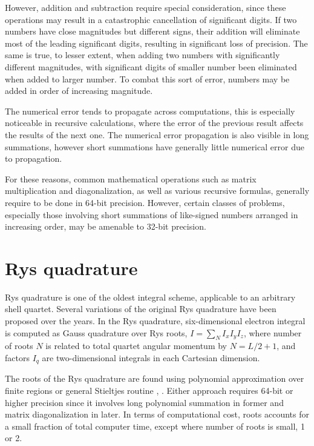 \documentclass[12pt]{article}
\begin{document}
However, addition and subtraction require special consideration, since these operations may result in a catastrophic cancellation of significant digits.
If two numbers have close magnitudes but different signs, their addition will eliminate most of the leading significant digits, resulting in significant loss of precision.
The same is true, to lesser extent, when adding two numbers with significantly different magnitudes, with significant digits of smaller number been eliminated when added
to larger number.  To combat this sort of error, numbers may be added in order of increasing magnitude.

The numerical error tends to propagate across computations, this is especially noticeable in recursive calculations, where the error of the previous result
 affects the results of the next one.  The numerical error propagation is also visible in long summations, however short summations have generally little
numerical error due to propagation.

 For these reasons, common mathematical operations such as matrix multiplication  and diagonalization, as well as various recursive formulas, generally require
to be done in 64-bit precision.  However, certain classes of problems, especially those involving short summations of like-signed numbers
arranged in increasing order, may be amenable to 32-bit precision.


\section{Rys quadrature}
Rys quadrature \cite{rys_computation_1983} is one of the oldest integral scheme, applicable to an arbitrary shell quartet.
Several variations of the original Rys quadrature have been proposed over the years.
In the Rys quadrature, six-dimensional electron integral is  computed as Gauss quadrature over  Rys roots, $I = \sum_N I_x I_y I_z $,
where number of roots $N$ is related to total quartet angular momentum by $N = L/2 + 1 $,
and factors $I_q$ are two-dimensional integrals in each Cartesian dimension.

The roots of the Rys quadrature are found using  polynomial approximation over finite regions or general Stieltjes routine \cite{sagar1992calculation}, \cite{davidson_basis_1986, plato_concise_2003, press_numerical_2002, gmplib}.
Either approach requires 64-bit or higher precision since it involves long polynomial summation in former and matrix  diagonalization in later.
In terms of computational cost, roots accounts for a small fraction of total computer time, except where number of roots is small, 1 or 2.
\end{document}
